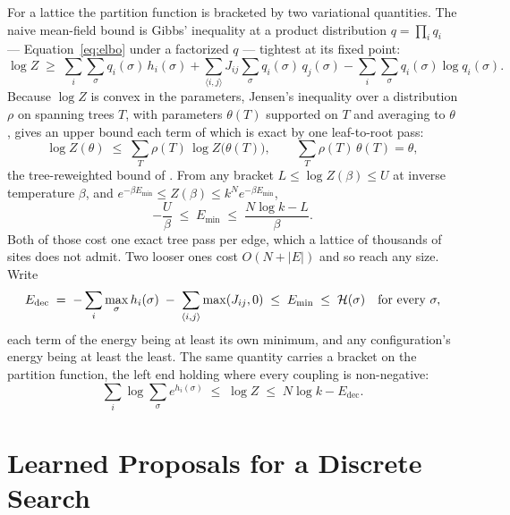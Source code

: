 \documentclass[11pt,a4paper]{article}
\begin{document}
For a lattice the partition function is bracketed by two variational
quantities. The naive mean-field bound is Gibbs' inequality at a product
distribution $q = \prod_i q_i$ --- Equation~\ref{eq:elbo} under a factorized
$q$ --- tightest at its fixed point:
\begin{equation}
  \log Z \;\ge\; \sum_i \sum_\sigma q_i(\sigma)\, h_i(\sigma)
    + \sum_{\langle i,j \rangle} J_{ij} \sum_\sigma q_i(\sigma)\, q_j(\sigma)
    - \sum_i \sum_\sigma q_i(\sigma) \log q_i(\sigma) .
  \label{eq:mean-field-bound}
\end{equation}
Because $\log Z$ is convex in the parameters, Jensen's inequality over a
distribution $\rho$ on spanning trees $T$, with parameters $\theta(T)$
supported on $T$ and averaging to $\theta$, gives an upper bound each term of
which is exact by one leaf-to-root pass:
\begin{equation}
  \log Z(\theta) \;\le\; \sum_T \rho(T)\, \log Z\big(\theta(T)\big),
  \qquad
  \sum_T \rho(T)\,\theta(T) = \theta ,
  \label{eq:spanning-tree-bound}
\end{equation}
the tree-reweighted bound of \citet{wainwright2005}. From any bracket
$L \le \log Z(\beta) \le U$ at inverse temperature $\beta$, and
$e^{-\beta E_{\min}} \le Z(\beta) \le k^N e^{-\beta E_{\min}}$,
\begin{equation}
  -\frac{U}{\beta} \;\le\; E_{\min} \;\le\; \frac{N \log k - L}{\beta} .
  \label{eq:ground-state-bounds}
\end{equation}
Both of those cost one exact tree pass per edge, which a lattice of thousands
of sites does not admit. Two looser ones cost $O(N + |E|)$ and so reach any
size. Write
\begin{equation}
  E_{\mathrm{dec}} \;=\; -\sum_i \max_\sigma h_i(\sigma)
      \;-\; \sum_{\langle i,j \rangle} \max(J_{ij}, 0)
  \;\le\; E_{\min}
  \;\le\; \mathcal{H}(\sigma) \quad \text{for every } \sigma ,
  \label{eq:decoupled-energy-bound}
\end{equation}
each term of the energy being at least its own minimum, and any
configuration's energy being at least the least. The same quantity carries a
bracket on the partition function, the left end holding where every coupling
is non-negative:
\begin{equation}
  \sum_i \log \sum_\sigma e^{h_i(\sigma)} \;\le\; \log Z
    \;\le\; N \log k - E_{\mathrm{dec}} .
  \label{eq:saturated-bound}
\end{equation}

\section{Learned Proposals for a Discrete Search}
\label{sec:policy-gradient}
\end{document}
